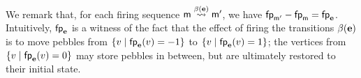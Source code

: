 
We remark that, for each firing sequence $\mathsf{m} \stackrel{\beta(\mathbf{e})}{\leadsto}
\mathsf{m}'$, we have $\mathsf{fp}_{\mathsf{m}'} - \mathsf{fp}_{\mathsf{m}} =
\mathsf{fp}_{\mathbf{e}}$. Intuitively, $\mathsf{fp}_{\mathbf{e}}$ is a witness of the fact
that the effect of firing the transitions $\beta(\mathbf{e})$ is to move
pebbles from ${\{ {v \mid \mathsf{fp}_{\mathbf{e}}(v) = -1} \}}$
to ${\{ {v \mid \mathsf{fp}_{\mathbf{e}}(v) = 1} \}}$;
the vertices from ${\{ {v \mid \mathsf{fp}_{\mathbf{e}}(v) = 0} \}}$ may store pebbles in between,
but are ultimately restored to their initial state.


